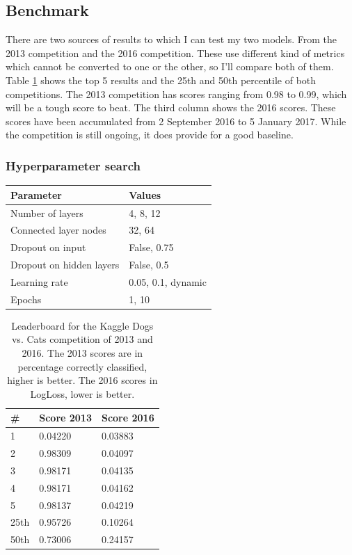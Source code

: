 \documentclass[11pt]{article}
\begin{document}
\subsection{Benchmark}
There are two sources of results to which I can test my two models. From the 2013 competition and the 2016 competition. These use different kind of metrics which cannot be converted to one or the other, so I'll compare both of them. Table \ref{leaderboard2013} shows the top 5 results and the 25th and 50th percentile of both competitions. The 2013 competition has scores ranging from 0.98 to 0.99, which will be a tough score to beat. The third column shows the 2016 scores. These scores have been accumulated from 2 September 2016 to 5 January 2017. While the competition is still ongoing, it does provide for a good baseline.

\subsubsection{Hyperparameter search}

\begin{tabular}{|l | l|}
	\hline
	Parameter & Values\\
	\hline
	Number of layers & 4, 8, 12\\
	Connected layer nodes & 32, 64\\
	Dropout on input & False, 0.75\\
	Dropout on hidden layers & False, 0.5\\
	Learning rate & 0.05, 0.1, dynamic \\
	Epochs & 1, 10\\
	\hline
\end{tabular}
\label{hypersearch}


\begin{table}
\centering
\begin{tabular}{l | ll}
	\# & Score 2013 & Score 2016\\
	\hline
	1 & 0.04220 & 0.03883\\
	2 & 0.98309 & 0.04097\\
	3 & 0.98171 & 0.04135\\
	4 & 0.98171 & 0.04162\\
	5 & 0.98137 & 0.04219\\
	\hline
	25th & 0.95726 & 0.10264\\
	50th & 0.73006& 0.24157
\end{tabular}
\caption{Leaderboard for the Kaggle Dogs vs. Cats competition of 2013 and 2016. The 2013 scores are in percentage correctly classified, higher is better. The 2016 scores in LogLoss, lower is better.}
\label{leaderboard2013}
\end{table}
\end{document}
